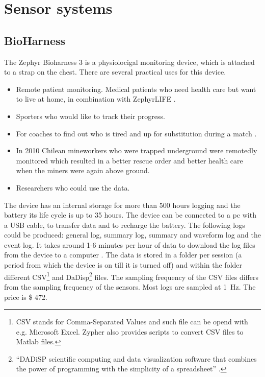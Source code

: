 \section{Sensor systems}
	\label{sec:sensorsystems}
	\subsection{BioHarness}
			The Zephyr Bioharness 3 \cite{bioharness} is a physiolocigal monitoring device, which is attached to a strap on the chest. There are several practical uses for this device.
			\begin{itemize}
				\item Remote patient monitoring. Medical patients who need health care but want to live at home, in combination with ZephyrLIFE \texttrademark \cite{bhpatients}.
				\item Sporters who would like to track their progress.
				\item For coaches to find out who is tired and up for substitution during a match \cite{bhsport}.
				\item In 2010 Chilean mineworkers who were trapped underground were remotedly monitored which resulted in a better rescue order and better health care when the miners were again above ground. \cite{chile}
				\item Researchers who could use the data.
			\end{itemize}

			The device has an internal storage for more than 500 hours logging and the battery its life cycle is up to 35 hours. The device can be connected to a pc with a USB cable, to transfer data and to recharge the battery. The following logs could be produced: general log, summary log, summary and waveform log and the event log. 
			It takes around 1-6 minutes per hour of data to download the log files from the device to a computer \cite{bhdatasheet}. The data is stored in a folder per session (a period from which the device is on till it is turned off) and within the folder different CSV\footnote{CSV stands for Comma-Separated Values and such file can be opend with e.g. Microsoft Excel. Zypher also provides scripts to convert CSV files to Matlab files.} and DaDisp\footnote{``DADiSP scientific computing and data visualization software that combines the power of programming with the simplicity of a spreadsheet'' \cite{dadisp}.} files. The sampling frequency of the CSV files differs from the sampling frequency of the sensors. Most logs are sampled at \SI{1}{\hertz}.
			The price is \$ 472.
		
